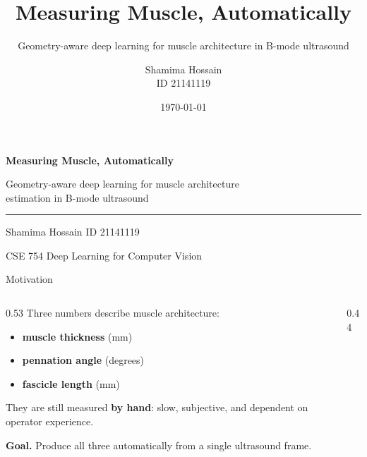 \documentclass[aspectratio=169,11pt]{beamer}
\title{Measuring Muscle, Automatically}
\subtitle{Geometry-aware deep learning for muscle architecture in B-mode ultrasound}
\author{Shamima Hossain \\ \small ID 21141119}
\institute{\small CSE 754 Deep Learning for Computer Vision}
\date{\small\today}
\newcommand{\hl}[1]{\textcolor{Accent}{\textbf{#1}}}
\begin{document}
\begin{frame}[plain]
  \vspace{0.8cm}
  \begin{center}
    {\Huge\bfseries\color{Ink} Measuring Muscle, Automatically\par}
    \vspace{0.4cm}
    {\large\color{Muted} Geometry-aware deep learning for muscle architecture\\
     estimation in B-mode ultrasound\par}
    \vspace{0.5cm}
    {\color{Accent}\rule{0.45\paperwidth}{1.2pt}}
    \vspace{0.5cm}

    {\large Shamima Hossain \quad\textcolor{Muted}{ID 21141119}\par}
    \vspace{0.2cm}
    {\color{Muted} CSE 754 Deep Learning for Computer Vision}
  \end{center}
\end{frame}

\begin{frame}{Motivation}
  \begin{columns}[T]
  \begin{column}{0.53\textwidth}
    Three numbers describe muscle architecture:
    \begin{itemize}
      \item \hl{muscle thickness} (mm)
      \item \hl{pennation angle} (degrees)
      \item \hl{fascicle length} (mm)
    \end{itemize}
    \vspace{0.3cm}
    They are still measured \textbf{by hand}: slow, subjective, and dependent on
    operator experience.
    \vspace{0.3cm}

    \textbf{Goal.} Produce all three automatically from a single ultrasound
    frame.
  \end{column}
  \begin{column}{0.44\textwidth}
    \centering
  \end{column}
  \end{columns}
\end{frame}
\end{document}
